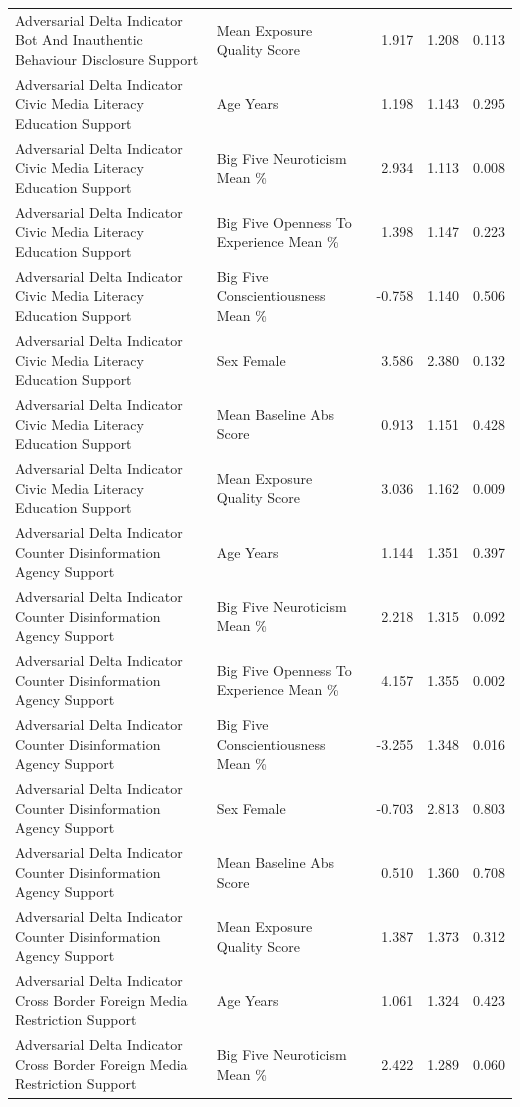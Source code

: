 \begin{table}[htbp]
\begin{threeparttable}
\begin{tabular}{llrrr}
Adversarial Delta Indicator Bot And Inauthentic Behaviour Disclosure Support & Mean Exposure Quality Score & 1.917 & 1.208 & 0.113 \\
Adversarial Delta Indicator Civic Media Literacy Education Support & Age Years & 1.198 & 1.143 & 0.295 \\
Adversarial Delta Indicator Civic Media Literacy Education Support & Big Five Neuroticism Mean \% & 2.934 & 1.113 & 0.008 \\
Adversarial Delta Indicator Civic Media Literacy Education Support & Big Five Openness To Experience Mean \% & 1.398 & 1.147 & 0.223 \\
Adversarial Delta Indicator Civic Media Literacy Education Support & Big Five Conscientiousness Mean \% & -0.758 & 1.140 & 0.506 \\
Adversarial Delta Indicator Civic Media Literacy Education Support & Sex Female & 3.586 & 2.380 & 0.132 \\
Adversarial Delta Indicator Civic Media Literacy Education Support & Mean Baseline Abs Score & 0.913 & 1.151 & 0.428 \\
Adversarial Delta Indicator Civic Media Literacy Education Support & Mean Exposure Quality Score & 3.036 & 1.162 & 0.009 \\
Adversarial Delta Indicator Counter Disinformation Agency Support & Age Years & 1.144 & 1.351 & 0.397 \\
Adversarial Delta Indicator Counter Disinformation Agency Support & Big Five Neuroticism Mean \% & 2.218 & 1.315 & 0.092 \\
Adversarial Delta Indicator Counter Disinformation Agency Support & Big Five Openness To Experience Mean \% & 4.157 & 1.355 & 0.002 \\
Adversarial Delta Indicator Counter Disinformation Agency Support & Big Five Conscientiousness Mean \% & -3.255 & 1.348 & 0.016 \\
Adversarial Delta Indicator Counter Disinformation Agency Support & Sex Female & -0.703 & 2.813 & 0.803 \\
Adversarial Delta Indicator Counter Disinformation Agency Support & Mean Baseline Abs Score & 0.510 & 1.360 & 0.708 \\
Adversarial Delta Indicator Counter Disinformation Agency Support & Mean Exposure Quality Score & 1.387 & 1.373 & 0.312 \\
Adversarial Delta Indicator Cross Border Foreign Media Restriction Support & Age Years & 1.061 & 1.324 & 0.423 \\
Adversarial Delta Indicator Cross Border Foreign Media Restriction Support & Big Five Neuroticism Mean \% & 2.422 & 1.289 & 0.060 \\

\end{tabular}
\end{threeparttable}
\end{table}
